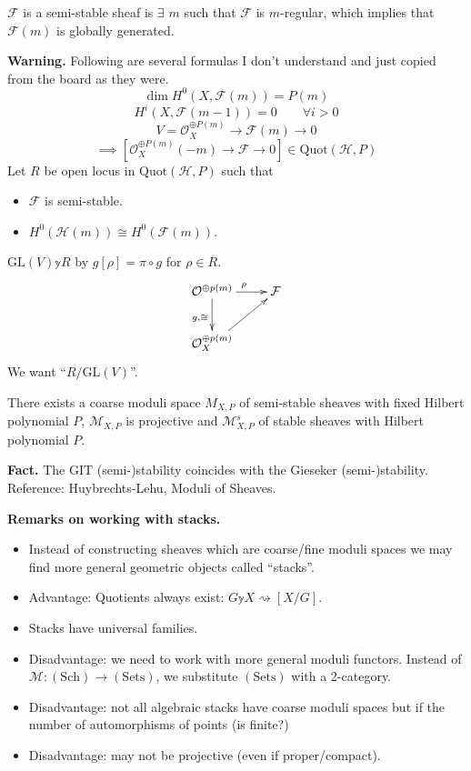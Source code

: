 $\mathcal{F}$ is a semi-stable sheaf is  $\exists $ $m$ such that
$\mathcal{F}$ is $m$-regular, which implies that $\mathcal{F}(m)$ is globally
generated.

{\bf Warning.} Following are several formulas I don't understand and just copied
from the board as they were.
 $$
\dim H^{0}(X,\mathcal{F}(m))=P(m)
$$
$$
H^{i}(X,\mathcal{F}(m-1))=0\qquad \forall i>0
$$
$$
V=\mathcal{O}_X^{\oplus P(m)}\to \mathcal{F}(m)\to 0
$$
$$
\implies \left[ \mathcal{O}_X^{\oplus P(m)}(-m) \to \mathcal{F} \to 0 \right]
\in \text{Quot}(\mathcal{H},P)
$$
Let $R$ be open locus in $\text{Quot}(\mathcal{H},P)$ such that
\begin{itemize}
\item $\mathcal{F}$ is semi-stable.
\item $H^{0}(\mathcal{H}(m))\cong H^{0}(\mathcal{F}(m))$.
\end{itemize}
$\text{GL}(V)\mathbb{y} R$ by $g[\rho]=\pi \circ g$ for $\rho \in R$. 
$$
\xymatrix{
\mathcal{O}^{\oplus p(m)}\ar[r]^{\rho}\ar[d]_{g,\cong}&  \mathcal{F}\\
\mathcal{O}_X^{\oplus p(m)}\ar[ur]
}
$$
We want
``$R/\text{GL}(V)$''.

\begin{theorem}
\label{theorem-exists-coarse-moduli-space-of-semi-stable-sheaves-with-fixed
-Hilbert-polynomial}
There exists a coarse moduli space $M_{X,P}$ of semi-stable sheaves with fixed
Hilbert polynomial $P$, $\mathcal{M}_{X,P}$ is projective and
$\mathcal{M}_{X,P}^s$ of stable sheaves with Hilbert polynomial $P$.
\end{theorem}

{\bf Fact.} The GIT (semi-)stability coincides with the Gieseker
(semi-)stability. Reference: Huybrechts-Lehu, Moduli of Sheaves.

{\bf Remarks on working with stacks.}

\begin{itemize}
\item Instead of constructing sheaves which are coarse/fine moduli spaces we may
find more general geometric objects called ``stacks''.
\item Advantage: Quotients always exist: 
$G \mathbb{y} X \rightsquigarrow [X/G]$.
\item Stacks have universal families.
\item Disadvantage: we need to work with more general moduli functors. Instead
of $\mathcal{M}:(\text{Sch}) \to (\text{Sets})$, we substitute $(\text{Sets})$
with a 2-category.
\item Disadvantage: not all algebraic stacks have coarse moduli spaces but if
the number of automorphisms of points (is finite?)
\item Disadvantage: may not be projective (even if proper/compact).
\end{itemize}

